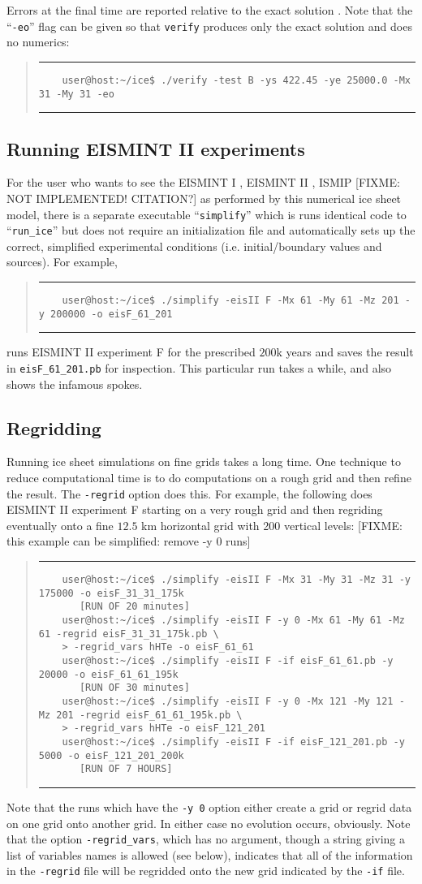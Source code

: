 \documentclass[11pt,final]{amsart}
\newcommand{\normalspacing}{\renewcommand{\baselinestretch}{1.1}\tiny\normalsize}
\renewcommand{\t}[1]{\texttt{#1}}
\newcommand{\Vend}{ \rule{4.6in}{0.1mm}\end{quote}\normalsize }
\newcommand{\beginV}{ \scriptsize\begin{quote}\rule{4.6in}{0.1mm}\begin{verbatim} }
\begin{document}
Errors at the final time are reported relative to the exact solution \cite{BLKCB}.  Note that the ``\t{-eo}'' flag can be given so that \t{verify} produces only the exact solution and does no numerics:
\beginV
    user@host:~/ice$ ./verify -test B -ys 422.45 -ye 25000.0 -Mx 31 -My 31 -eo
\end{verbatim}
\Vend

\subsection{Running EISMINT II experiments}  For the user who wants to see the EISMINT I \cite{EISMINT96}, EISMINT II \cite{EISMINT00}, ISMIP [FIXME: NOT IMPLEMENTED! CITATION?] as performed by this numerical ice sheet model, there is a separate executable ``\verb|simplify|'' which is runs identical code to ``\verb|run_ice|'' but does not require an initialization file and automatically sets up the correct, simplified experimental conditions (i.e. initial/boundary values and sources).  For example,
\beginV
    user@host:~/ice$ ./simplify -eisII F -Mx 61 -My 61 -Mz 201 -y 200000 -o eisF_61_201
\end{verbatim}
\Vend
runs EISMINT II experiment F for the prescribed $200$k years and saves the result in \verb|eisF_61_201.pb| for inspection.  This particular run takes a while, and also shows the infamous spokes.


\subsection{Regridding}  \normalspacing Running ice sheet simulations on fine grids takes a long time.  One technique to reduce computational time is to do computations on a rough grid and then refine the result.  The \verb|-regrid| option does this.  For example, the following does EISMINT II experiment F starting on a very rough grid and then regriding eventually onto a fine $12.5$ km horizontal grid with 200 vertical levels:
[FIXME: this example can be simplified: remove -y 0 runs]
\beginV
    user@host:~/ice$ ./simplify -eisII F -Mx 31 -My 31 -Mz 31 -y 175000 -o eisF_31_31_175k
       [RUN OF 20 minutes]
    user@host:~/ice$ ./simplify -eisII F -y 0 -Mx 61 -My 61 -Mz 61 -regrid eisF_31_31_175k.pb \
    > -regrid_vars hHTe -o eisF_61_61
    user@host:~/ice$ ./simplify -eisII F -if eisF_61_61.pb -y 20000 -o eisF_61_61_195k
       [RUN OF 30 minutes]
    user@host:~/ice$ ./simplify -eisII F -y 0 -Mx 121 -My 121 -Mz 201 -regrid eisF_61_61_195k.pb \
    > -regrid_vars hHTe -o eisF_121_201
    user@host:~/ice$ ./simplify -eisII F -if eisF_121_201.pb -y 5000 -o eisF_121_201_200k
       [RUN OF 7 HOURS]
\end{verbatim}
\Vend
Note that the runs which have the \verb|-y 0| option either create a grid or regrid data on one grid onto another grid.  In either case no evolution occurs, obviously.  Note that the option \verb|-regrid_vars|, which has no argument, though a string giving a list of variables names is allowed (see below), indicates that all of the information in the \verb|-regrid| file will be regridded onto the new grid indicated by the \verb|-if| file.
\end{document}

